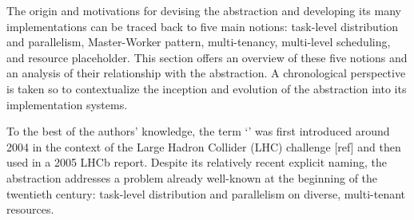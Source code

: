 \documentclass{sig-alternate}
\begin{document}






The origin and motivations for devising the \pilot abstraction and developing
its many implementations can be traced back to five main notions: task-level
distribution and parallelism, Master-Worker pattern, multi-tenancy,
multi-level scheduling, and resource placeholder. This section offers an
overview of these five notions and an analysis of their relationship with the
\pilot abstraction. A chronological perspective is taken so to contextualize
the inception and evolution of the \pilot abstraction into its implementation
systems.

To the best of the authors' knowledge, the term `\pilotjob' was first
introduced around 2004 in the context of the Large Hadron Collider (LHC)
challenge [ref] and then used in a 2005 LHCb report\cite{lhcb2005}. Despite its
relatively recent explicit naming, the \pilot abstraction addresses a problem
already well-known at the beginning of the twentieth century: task-level
distribution and parallelism on diverse, multi-tenant resources.
\end{document}
